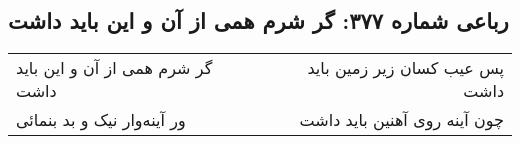 \begin{center}
\section*{رباعی شماره ۳۷۷: گر شرم همی از آن و این باید داشت}
\label{sec:0377}
\begin{longtable}{l p{0.5cm} r}
گر شرم همی از آن و این باید داشت
&&
پس عیب کسان زیر زمین باید داشت
\\
ور آینه‌وار نیک و بد بنمائی
&&
چون آینه روی آهنین باید داشت
\\
\end{longtable}
\end{center}
